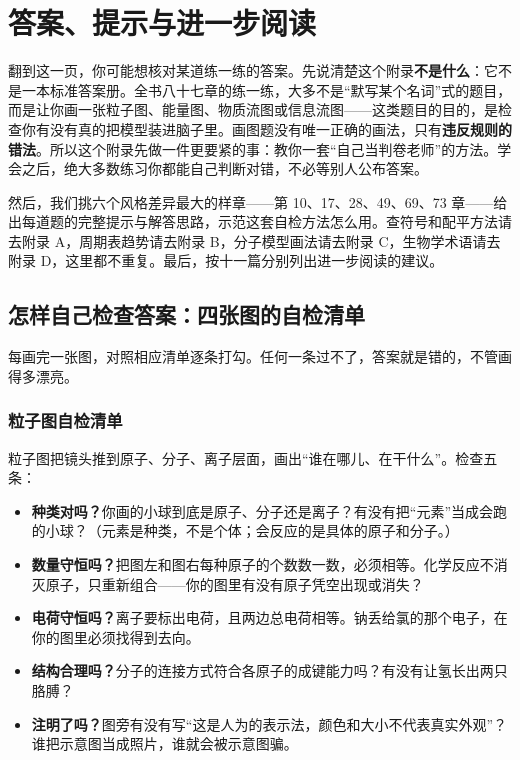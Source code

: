 \chapter{答案、提示与进一步阅读}

翻到这一页，你可能想核对某道练一练的答案。先说清楚这个附录\textbf{不是什么}：它不是一本标准答案册。全书八十七章的练一练，大多不是“默写某个名词”式的题目，而是让你画一张粒子图、能量图、物质流图或信息流图——这类题目的目的，是检查你有没有真的把模型装进脑子里。画图题没有唯一正确的画法，只有\textbf{违反规则的错法}。所以这个附录先做一件更要紧的事：教你一套“自己当判卷老师”的方法。学会之后，绝大多数练习你都能自己判断对错，不必等别人公布答案。

然后，我们挑六个风格差异最大的样章——第 10、17、28、49、69、73 章——给出每道题的完整提示与解答思路，示范这套自检方法怎么用。查符号和配平方法请去附录 A，周期表趋势请去附录 B，分子模型画法请去附录 C，生物学术语请去附录 D，这里都不重复。最后，按十一篇分别列出进一步阅读的建议。

\section{怎样自己检查答案：四张图的自检清单}

每画完一张图，对照相应清单逐条打勾。任何一条过不了，答案就是错的，不管画得多漂亮。

\subsection{粒子图自检清单}

粒子图把镜头推到原子、分子、离子层面，画出“谁在哪儿、在干什么”。检查五条：

\begin{itemize}[itemsep=2pt]
\item \textbf{种类对吗？}你画的小球到底是原子、分子还是离子？有没有把“元素”当成会跑的小球？（元素是种类，不是个体；会反应的是具体的原子和分子。）
\item \textbf{数量守恒吗？}把图左和图右每种原子的个数数一数，必须相等。化学反应不消灭原子，只重新组合——你的图里有没有原子凭空出现或消失？
\item \textbf{电荷守恒吗？}离子要标出电荷，且两边总电荷相等。钠丢给氯的那个电子，在你的图里必须找得到去向。
\item \textbf{结构合理吗？}分子的连接方式符合各原子的成键能力吗？有没有让氢长出两只胳膊？
\item \textbf{注明了吗？}图旁有没有写“这是人为的表示法，颜色和大小不代表真实外观”？谁把示意图当成照片，谁就会被示意图骗。
\end{itemize}

